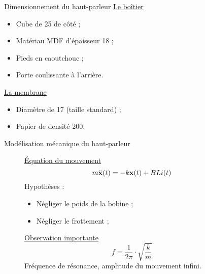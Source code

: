 \documentclass[pdf]{beamer}
\newcommand\fv[1]{{\bf #1}} %
\newcommand\fvdd[1]{\ddot{\bf #1}} %
\begin{document}
\begin{frame}{Dimensionnement du haut-parleur}
	\underline{Le boîtier}
		\begin{itemize}
			\item Cube de \unit{25}{\centi\meter} de côté ;
			\item Matériau MDF d'épaisseur \unit{18}{\milli\meter} ;
			\item Pieds en caoutchouc ;
			\item Porte coulissante à l'arrière.
		\end{itemize}
	\underline{La membrane}
		\begin{itemize}
			\item Diamètre de \unit{17}{\centi\meter} (taille standard) ;
			\item Papier de densité \unit{200}{\gram\per\meter\squared}.
		\end{itemize}
\end{frame}

\begin{frame}{Modélisation mécanique du haut-parleur}
	\begin{figure}[ht]
			\underline{Équation du mouvement}
			$$m\fvdd{x}(t) = -k\fv{x}(t) + BLi(t)$$
			Hypothèses : 
				\begin{itemize}
					\item Négliger le poids de la bobine ;
					\item Négliger le frottement ;
				\end{itemize}
		\endminipage\hfill
			\underline{Observation importante}
			$$f = \frac{1}{2\pi} \cdot{\sqrt{\frac{k}{m}}}$$
			Fréquence de résonance, amplitude du mouvement infini.
		\endminipage\hfill
	\end{figure}
\end{frame}
\end{document}
